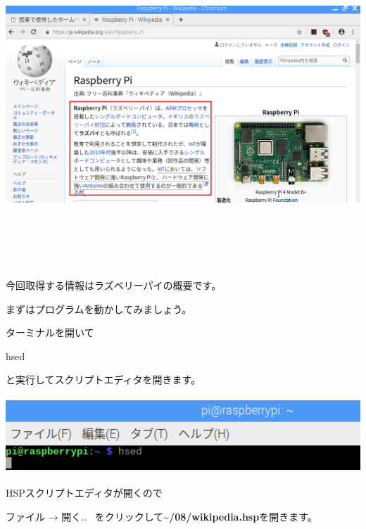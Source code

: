 \documentclass[a4paper,12pt,dvipdfmx]{jarticle}
\begin{document}
\begin{center}
\includegraphics[width=17.006cm,height=12.157cm]{textbook-img059.png}

\end{center}
今回取得する情報はラズベリーパイの概要です。

まずはプログラムを動かしてみましょう。

ターミナルを開いて

hsed

と実行してスクリプトエディタを開きます。



\begin{center}
\includegraphics[width=17.057cm,height=2.866cm]{textbook-img013.png}

\end{center}

\bigskip

\clearpage
HSPスクリプトエディタが開くので


\bigskip

ファイル → 開く..
\ をクリックして\textbf{\~{}/08/wikipedia.hsp}を開きます。
\end{document}

